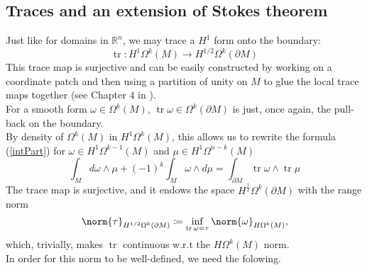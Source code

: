 \documentclass{ifacconf}
\newcommand{\R}{\mathbb{R}}
\newcommand{\tr}{\operatorname{tr}}
\newcommand{\drh}[2]{\Omega^{#2}(#1)}
\begin{document}
\subsection{Traces and an extension of Stokes theorem}
Just like for domains in $\R^n$, we may trace a $H^1$ form onto the boundary:
\[
    \tr\colon H^1\drh{M}{k}\to H^{1/2}\drh{\partial M}{k}
\]
This trace map is surjective and can be easily constructed by working on a coordinate patch and then using a partition of unity on $M$ to glue the local trace maps together (see Chapter $4$ in \cite{PD1:96}).\\
For a smooth form $\omega\in\drh{M}{k}$, $\tr\omega\in\drh{\partial M}{k}$ is just, once again, the pull-back on the boundary.\\
By density of $\drh{M}{k}$ in $H^1\drh{M}{k}$, this allows us to rewrite the formula (\ref{intPart}) for $\omega\in H^1\drh{M}{k-1}$ and $\mu\in H^1\drh{M}{n-k}$
\begin{equation}\label{stH1}
    \int_M d\omega\wedge \mu + (-1)^k\int_M \omega\wedge d\mu =\int_{\partial M} \tr \omega\wedge \tr \mu 
\end{equation}
The trace map is surjective, and it endows the space $H^{\frac{1}{2}}\drh{\partial M}{k}$ with the range norm
\begin{equation}\label{halfnorm}
    \norm{\tau}_{H^{1/2}\drh{\partial M}{k}}\coloneqq \inf_{\tr\omega=\tau}\norm{\omega}_{H\drh{M}{k}},
\end{equation}
which, trivially, makes $\tr$ continuous w.r.t the $H\drh{M}{k}$ norm.\\
In order for this norm to be well-defined, we need the folowing.
\end{document}
